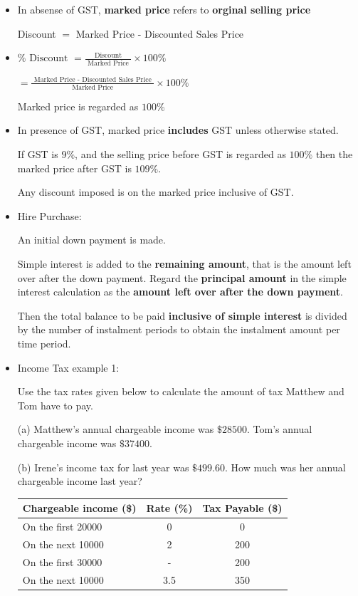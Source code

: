 \documentclass[twocolumn]{article}
\begin{document}
\begin{itemize}
\item In absense of GST, {\bf marked price} refers to {\bf orginal selling price}

Discount $=$ Marked Price - Discounted Sales Price

\item  $\% \text { Discount }=\frac{\text { Discount }}{\text { Marked Price }} \times 100 \%$

$=\frac{\text { Marked Price - Discounted Sales Price }}{\text { Marked Price }} \times 100 \%$

Marked price is regarded as $100 \%$

\item In presence of GST, marked price {\bf includes} GST unless otherwise stated.

If GST is $9\%$, and the selling price before GST is regarded as $100\%$ then the marked price after GST is $109\%$.

Any discount imposed is on the marked price inclusive of GST.

\item Hire Purchase:

An initial down payment is made.

Simple interest is added to the {\bf remaining amount}, that is the amount left over after the down payment. Regard the {\bf principal amount} in the simple interest calculation as the {\bf amount left over after the down payment}.

Then the total balance to be paid {\bf inclusive of simple interest} is divided by the number of instalment periods to obtain the instalment amount per time period.

\item Income Tax example 1:

Use the tax rates given below to calculate the amount of tax Matthew and Tom have to pay.

(a) Matthew's annual chargeable income was $\$ 28500$. Tom's annual chargeable income was $\$ 37400$.

(b) Irene's income tax for last year was $\$ 499.60$. How much was her annual chargeable income last year?

\begin{tabular}{|l|c|c|}
	\hline Chargeable income (\$) & Rate (\%) & Tax Payable (\$) \\
	\hline On the first 20000 & 0 & 0 \\
	On the next 10000 & 2 & 200 \\
	\hline On the first 30000 & - & 200 \\
	On the next 10000 & 3.5 & 350 \\
	\hline
\end{tabular}


\end{itemize}
\end{document}
